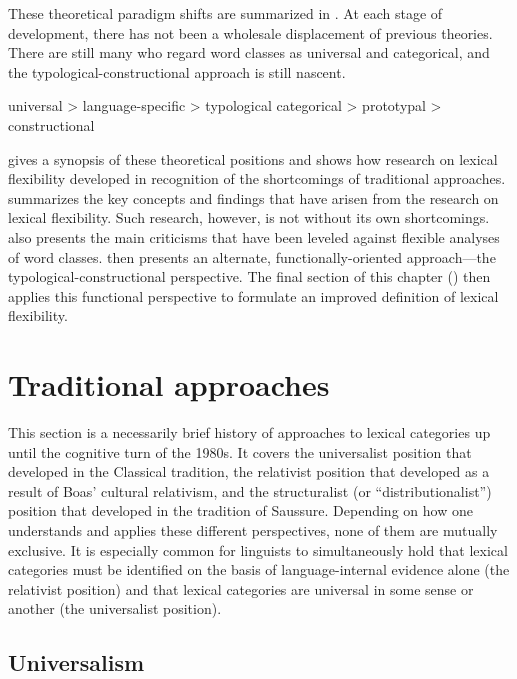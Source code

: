 These theoretical paradigm shifts are summarized in . At each stage of development, there has not been a wholesale displacement of previous theories. There are still many who regard word classes as universal and categorical, and the typological-constructional approach is still nascent.

\begin{exe}
  \ex\label{ex:2.1}
  \begin{xlist}
    \ex universal > language-specific > typological
    \ex categorical > prototypal > constructional
  \end{xlist}
\end{exe}

 gives a synopsis of these theoretical positions and shows how research on lexical flexibility developed in recognition of the shortcomings of traditional approaches.  summarizes the key concepts and findings that have arisen from the research on lexical flexibility. Such research, however, is not without its own shortcomings.  also presents the main criticisms that have been leveled against flexible analyses of word classes.  then presents an alternate, functionally-oriented approach—the typological-constructional perspective. The final section of this chapter () then applies this functional perspective to formulate an improved definition of lexical flexibility.

\section{Traditional approaches}
\label{sec:2.2}

This section is a necessarily brief history of approaches to lexical categories up until the cognitive turn of the 1980s. It covers the universalist position that developed in the Classical tradition, the relativist position that developed as a result of Boas' cultural relativism, and the structuralist (or \enquote{distributionalist}) position that developed in the tradition of Saussure. Depending on how one understands and applies these different perspectives, none of them are mutually exclusive. It is especially common for linguists to simultaneously hold that lexical categories must be identified on the basis of language-internal evidence alone (the relativist position) and that lexical categories are universal in some sense or another (the universalist position).

\subsection{Universalism}
\label{sec:2.2.1}


